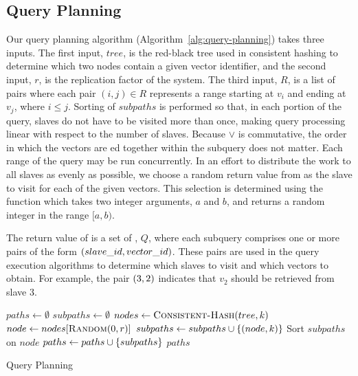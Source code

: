 \subsection{Query Planning}
Our query planning algorithm (Algorithm~\ref{alg:query-planning}) takes three
inputs. The first input, \(tree\), is the red-black tree used in consistent
hashing to determine which two nodes contain a given vector identifier, and the
second input, \(r\), is the replication factor of the system.
The third input,
\(R\),
is a list of pairs where each pair \((i,j)\in R\) represents a range starting at
\(v_i\) and ending at \(v_j\), where \(i\leq j\). Sorting of \(subpaths\) is performed so that, in each
portion of the query, slaves do not have to be visited more than once, making
query processing linear with respect to the number of slaves. Because
\(\lor\) is commutative, the order in which the vectors are ed
together within the subquery does not matter. Each range of the query may be
run concurrently. In an effort to distribute the work to all slaves as evenly
as possible, we choose a random return value from 
as the slave to visit for each of the given vectors. This selection is
determined using the  function which takes two integer
arguments, \(a\) and \(b\), and returns a random integer in the range
\([a, b)\).
\par
The return value of  is a set of ,
\(Q\), where each subquery comprises one or more pairs of the form
\(\left(slave\_id,vector\_id\right)\). These pairs are used in the query execution
algorithms to determine which slaves to visit and which vectors to obtain. For
example, the pair \(\left(3, 2\right)\) indicates that \(v_2\) should be retrieved
from slave 3.
%
\begin{algorithm}
    \begin{algorithmic}
            \State $paths \gets \emptyset$
                \State $subpaths \gets \emptyset$
                    \State $nodes \gets \Call{Consistent-Hash}{tree, k}$
                    \State $node \gets nodes[\Call{Random}{0, r}]$
                    \State $subpaths \gets subpaths \cup \left\{(node, k)\right\}$
                \EndFor
                \State Sort $subpaths$ on $node$
                \State $paths \gets paths \cup \left\{subpaths\right\}$
            \EndFor
            \Return $paths$
        \EndProcedure
    \end{algorithmic}
    \caption{Query Planning}
    \label{alg:query-planning}
\end{algorithm}
%
